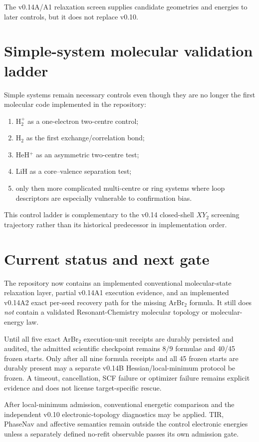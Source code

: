 The v0.14A/A1 relaxation screen supplies candidate geometries and energies to later controls, but it does not replace v0.10.

\section{Simple-system molecular validation ladder}
Simple systems remain necessary controls even though they are no longer the first molecular code implemented in the repository:
\begin{enumerate}
\item $\mathrm{H}_2^+$ as a one-electron two-centre control;
\item $\mathrm{H}_2$ as the first exchange/correlation bond;
\item HeH$^+$ as an asymmetric two-centre test;
\item LiH as a core--valence separation test;
\item only then more complicated multi-centre or ring systems where loop descriptors are especially vulnerable to confirmation bias.
\end{enumerate}
This control ladder is complementary to the v0.14 closed-shell $XY_2$ screening trajectory rather than its historical predecessor in implementation order.

\section{Current status and next gate}
The repository now contains an implemented conventional molecular-state relaxation layer, partial v0.14A1 execution evidence, and an implemented v0.14A2 exact per-seed recovery path for the missing ArBr$_2$ formula.  It still does \emph{not} contain a validated Resonant-Chemistry molecular topology or molecular-energy law.

Until all five exact ArBr$_2$ execution-unit receipts are durably persisted and audited, the admitted scientific checkpoint remains 8/9 formulae and 40/45 frozen starts.  Only after all nine formula receipts and all 45 frozen starts are durably present may a separate v0.14B Hessian/local-minimum protocol be frozen.  A timeout, cancellation, SCF failure or optimizer failure remains explicit evidence and does not license target-specific rescue.

After local-minimum admission, conventional energetic comparison and the independent v0.10 electronic-topology diagnostics may be applied.  TIR, PhaseNav and affective semantics remain outside the control electronic energies unless a separately defined no-refit observable passes its own admission gate.
